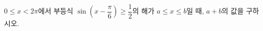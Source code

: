 $0\le x<2\pi$에서 부등식 $\sin\left(x-\dfrac{\pi}{6}\right)\ge\dfrac{1}{2}$의 해가 $a\le x\le b$일 때, $a+b$의 값을 구하시오.
